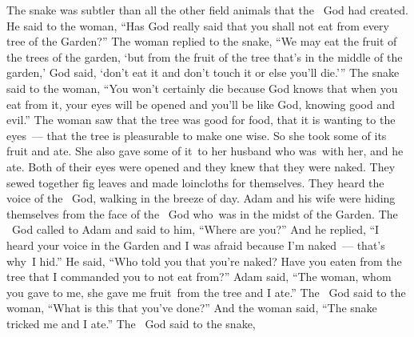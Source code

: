
\begin{inparaenum}
   The snake was subtler than all the other field animals that the \lord\ God had created. He said to the woman, ``Has God really said that you shall not eat from every tree of the Garden?''%
   The woman replied to the snake, ``We may eat the fruit of the trees of the garden,%
   `but from the fruit of the tree that's in the middle of the garden,' God said, `don't eat it and don't touch it or else you'll die.'\thinspace''%
   The snake said to the woman, ``You won't certainly die%
   because God knows that when you eat from it, your eyes will be opened and you'll be like God, knowing good and evil.''%
   The woman saw that the tree was good for food, that it is wanting to the eyes~--- that the tree is pleasurable to make one wise. So she took some of its fruit and ate. She also gave some of it\understood\ to her husband who was\understood\ with her, and he ate.%
   Both of their eyes were opened and they knew that they were naked. They sewed together fig leaves and made loincloths for themselves.%
   They heard the voice of the \lord\ God, walking in the breeze of day. Adam and his wife were hiding themselves from the face of the \lord\ God who\understood\ was in the midst of the Garden.%
   The \lord\ God called to Adam and said to him, ``Where are you?''%
   And he replied, ``I heard your voice in the Garden and I was afraid because I'm naked~--- that's why\understood\ I hid.''%
   He said, ``Who told you that you're naked? Have you eaten from the tree that I commanded you to not eat from?''%
   Adam said, ``The woman, whom you gave to me, she gave me fruit\understood\ from the tree and I ate.''%
   The \lord\ God said to the woman, ``What is this that you've done?'' And the woman said, ``The snake tricked me and I ate.''%
   The \lord\ God said to the snake,\smallskip%
  

\end{inparaenum}
